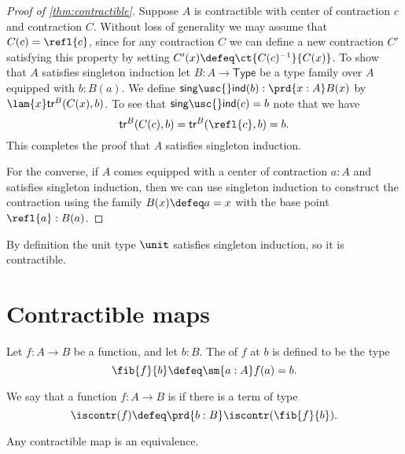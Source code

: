 \begin{proof}[Proof of \autoref{thm:contractible}]
Suppose $A$ is contractible with center of contraction $c$ and contraction $C$. Without loss of generality we may assume that $C(c)=\refl{c}$, since for any contraction $C$ we can define a new contraction $C'$ satisfying this property by setting $C'(x)\defeq\ct{C(c)^{-1}}{C(x)}$. To show that $A$ satisfies singleton induction let $B:A\to\mathsf{Type}$ be a type family over $A$ equipped with $b:B(a)$. We define $\mathsf{sing\usc{}ind}(b):\prd{x:A}B(x)$ by $\lam{x}\mathsf{tr}^B(C(x),b)$. To see that $\mathsf{sing\usc{}ind}(c)=b$ note that we have
\begin{equation*}
\mathsf{tr}^B(C(c),b)=\mathsf{tr}^B(\refl{c},b)=b.
\end{equation*}
This completes the proof that $A$ satisfies singleton induction.

For the converse, if $A$ comes equipped with a center of contraction $a:A$ and satisfies singleton induction, then we can use singleton induction to construct the contraction using the family $B(x)\defeq a=x$ with the base point $\refl{a}:B(a)$. 
\end{proof}

\begin{eg}
By definition the unit type $\unit$ satisfies singleton induction, so it is contractible.
\end{eg}

\section{Contractible maps}
\begin{defn}
Let $f:A\to B$ be a function, and let $b:B$. The  of $f$ at $b$ is defined to be the type
\begin{equation*}
\fib{f}{b}\defeq\sm{a:A}f(a)=b.
\end{equation*}
\end{defn}

\begin{defn}
We say that a function $f:A\to B$ is  if there is a term of type
\begin{equation*}
\iscontr(f)\defeq\prd{b:B}\iscontr(\fib{f}{b}).
\end{equation*}
\end{defn}

\begin{thm}\label{thm:equiv_contr}
Any contractible map is an equivalence.
\end{thm}

